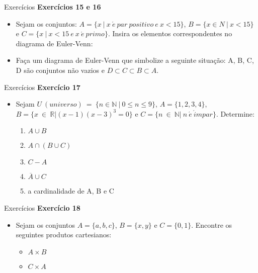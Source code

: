 \documentclass[aspectratio=169]{beamer}
\begin{document}
\begin{frame}{Exercícios}
    \textbf{Exercícios 15 e 16}
\begin{itemize}
    \item Sejam os conjuntos: $A = \{x ~ | ~ x ~ \acute{e} ~ par ~ positivo ~ e ~ x < 15\}$, $B = \{x \in N ~ | ~ x < 15\}$ e $C = \{x ~ | ~ x < 15 ~ e ~ x ~ \acute{e} ~ primo \}$. Insira os elementos correspondentes no diagrama de Euler-Venn:
    \item Faça um diagrama de Euler-Venn que simbolize a seguinte situação: A, B, C, D são conjuntos não vazios e $D \subset C \subset B \subset A$.
\end{itemize}
\end{frame}

\begin{frame}{Exercícios}
    \textbf{Exercício 17}
\begin{itemize}
    \item Sejam $U ~ (universo) ~ = ~ \{n \in \mathbb{N} ~ | ~ 0 \leq n \leq 9\}$, $A = \{1, 2, 3, 4\}$, $B = \{x ~ \in ~ \mathbb{R} | (x - 1) (x - 3)^3 = 0\}$ e $C = \{n ~ \in ~ \mathbb{N} | ~ n ~ \acute{e} ~ \acute{i}mpar \}$. Determine:
    \begin{enumerate}
        \item $A \cup B$
        \item $A \cap (B \cup C)$
        \item $C - A$
        \item $ \overline{A} \cup C$
        \item a cardinalidade de A, B e C
    \end{enumerate}
\end{itemize}

\end{frame}



\begin{frame}{Exercícios}
    \textbf{Exercício 18}

\begin{itemize}
    \item Sejam os conjuntos $A = \{a, b, c\}$, $B = \{x, y\}$ e $C = \{0, 1\}$. Encontre os seguintes produtos cartesianos:
    \begin{itemize}
        \item $A \times B$
        \item $C \times A$
    \end{itemize}

\end{itemize}

\end{frame}
\end{document}

